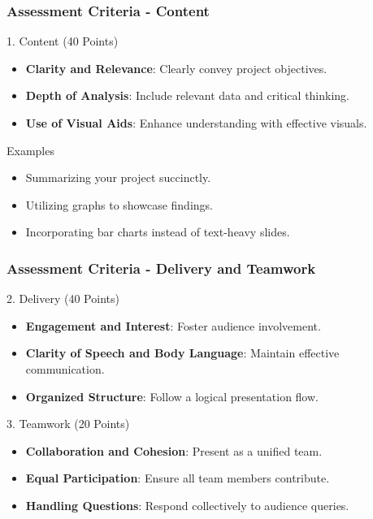 \documentclass{beamer}
\begin{document}
\begin{frame}[fragile]
    \frametitle{Assessment Criteria - Content}
    \begin{block}{1. Content (40 Points)}
        \begin{itemize}
            \item \textbf{Clarity and Relevance}: Clearly convey project objectives.
            \item \textbf{Depth of Analysis}: Include relevant data and critical thinking.
            \item \textbf{Use of Visual Aids}: Enhance understanding with effective visuals.
        \end{itemize}
    \end{block}
    
    \begin{block}{Examples}
        \begin{itemize}
            \item Summarizing your project succinctly.
            \item Utilizing graphs to showcase findings.
            \item Incorporating bar charts instead of text-heavy slides.
        \end{itemize}
    \end{block}
\end{frame}

\begin{frame}[fragile]
    \frametitle{Assessment Criteria - Delivery and Teamwork}
    \begin{block}{2. Delivery (40 Points)}
        \begin{itemize}
            \item \textbf{Engagement and Interest}: Foster audience involvement.
            \item \textbf{Clarity of Speech and Body Language}: Maintain effective communication.
            \item \textbf{Organized Structure}: Follow a logical presentation flow.
        \end{itemize}
    \end{block}

    \begin{block}{3. Teamwork (20 Points)}
        \begin{itemize}
            \item \textbf{Collaboration and Cohesion}: Present as a unified team.
            \item \textbf{Equal Participation}: Ensure all team members contribute.
            \item \textbf{Handling Questions}: Respond collectively to audience queries.
        \end{itemize}
    \end{block}
\end{frame}
\end{document}
